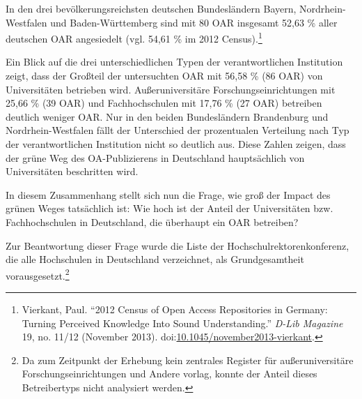 \documentclass[a4paper,
fontsize=11pt,
oneside,
numbers=noperiodatend,
parskip=half-,
bibliography=totoc,
final
]{scrartcl}
\begin{document}
In den drei bevölkerungsreichsten deutschen Bundesländern Bayern,
Nordrhein-Westfalen und Baden-Württemberg sind mit 80 OAR insgesamt
52,63 \% aller deutschen OAR angesiedelt (vgl. 54,61 \% im 2012
Census).\footnote{Vierkant, Paul. \enquote{2012 Census of Open Access
  Repositories in Germany: Turning Perceived Knowledge Into Sound
  Understanding.} \emph{D-Lib Magazine} 19, no. 11/12 (November 2013).
  doi:\href{http://doi.org/10.1045/november2013-vierkant}{10.1045/november2013-vierkant}.}

Ein Blick auf die drei unterschiedlichen Typen der verantwortlichen
Institution zeigt, dass der Großteil der untersuchten OAR mit 56,58 \%
(86 OAR) von Universitäten betrieben wird. Außeruniversitäre
Forschungseinrichtungen mit 25,66 \% (39 OAR) und Fachhochschulen mit
17,76 \% (27 OAR) betreiben deutlich weniger OAR. Nur in den beiden
Bundesländern Brandenburg und Nordrhein-Westfalen fällt der Unterschied
der prozentualen Verteilung nach Typ der verantwortlichen Institution
nicht so deutlich aus. Diese Zahlen zeigen, dass der grüne Weg des
OA-Publizierens in Deutschland hauptsächlich von Universitäten
beschritten wird.

In diesem Zusammenhang stellt sich nun die Frage, wie groß der Impact
des grünen Weges tatsächlich ist: Wie hoch ist der Anteil der
Universitäten bzw. Fachhochschulen in Deutschland, die überhaupt ein OAR
betreiben?

Zur Beantwortung dieser Frage wurde die Liste der
Hochschulrektorenkonferenz, die alle Hochschulen in Deutschland
verzeichnet, als Grundgesamtheit vorausgesetzt.\footnote{Da zum
  Zeitpunkt der Erhebung kein zentrales Register für außeruniversitäre
  Forschungseinrichtungen und Andere vorlag, konnte der Anteil dieses
  Betreibertyps nicht analysiert werden.}
\end{document}
